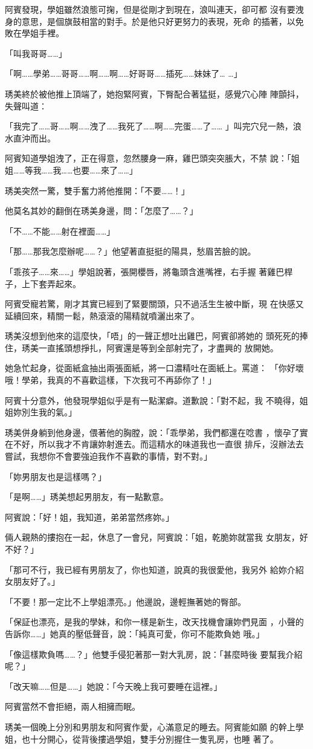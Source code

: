 阿賓發現，學姐雖然浪態可掬，但是從剛才到現在，浪叫連天，卻可都
沒有要洩身的意思，是個旗鼓相當的對手。於是他只好更努力的表現，死命
的插著，以免敗在學姐手裡。

「叫我哥哥……」

「啊……學弟……哥哥……啊……啊……好哥哥……插死……妹妹了…
…」

琇美終於被他推上頂端了，她抱緊阿賓，下臀配合著猛挺，感覺穴心陣
陣顫抖，失聲叫道：

「我完了……哥……啊……洩了……我死了……啊……完蛋……了……
」叫完穴兒一熱，浪水直沖而出。

阿賓知道學姐洩了，正在得意，忽然腰身一麻，雞巴頭突突脹大，不禁
說：「姐姐……等我……我……也要……來了……」

琇美突然一驚，雙手奮力將他推開：「不要……！」

他莫名其妙的翻倒在琇美身邊，問：「怎麼了……？」

「不……不能……射在裡面……」

「那……那我怎麼辦呢……？」他望著直挺挺的陽具，愁眉苦臉的說。

「乖孩子……來……」學姐說著，張開櫻唇，將龜頭含進嘴裡，右手握
著雞巴桿子，上下套弄起來。

阿賓受寵若驚，剛才其實已經到了緊要關頭，只不過活生生被中斷，現
在快感又延續回來，精關一鬆，熱滾滾的陽精就噴灑出來了。

琇美沒想到他來的這麼快，「唔」的一聲正想吐出雞巴，阿賓卻將她的
頭死死的捧住，琇美一直搖頭想掙扎，阿賓還是等到全部射完了，才盡興的
放開她。

她急忙起身，從面紙盒抽出兩張面紙，將一口濃精吐在面紙上。罵道：
「你好壞哦！學弟，我真的不喜歡這樣，下次我可不再舔你了！」

阿賓十分意外，他發現學姐似乎是有一點潔癖。道歉說：「對不起，我
不曉得，姐姐妳別生我的氣。」

琇美併身躺到他身邊，偎著他的胸膛，說：「乖學弟，我們都還在唸書
，懷孕了實在不好，所以我才不肯讓妳射進去。而這精水的味道我也一直很
排斥，沒辦法去嘗試，我想你不會要強迫我作不喜歡的事情，對不對。」

「妳男朋友也是這樣嗎？」

「是啊……」琇美想起男朋友，有一點歉意。

阿賓說：「好！姐，我知道，弟弟當然疼妳。」

倆人親熱的摟抱在一起，休息了一會兒，阿賓說：「姐，乾脆妳就當我
女朋友，好不好？」

「那可不行，我已經有男朋友了，你也知道，說真的我很愛他，我另外
給妳介紹女朋友好了。」

「不要！那一定比不上學姐漂亮。」他邊說，邊輕撫著她的臀部。

「保証也漂亮，是我的學妹，和你一樣是新生，改天找機會讓妳們見面
，小聲的告訴你……」她真的壓低聲音，說：「純真可愛，你可不能欺負她
哦。」

「像這樣欺負嗎……？」他雙手侵犯著那一對大乳房，說：「甚麼時後
要幫我介紹呢？」

「改天嘛……但是……」她說：「今天晚上我可要睡在這裡。」

阿賓當然不會拒絕，兩人相擁而眠。

琇美一個晚上分別和男朋友和阿賓作愛，心滿意足的睡去。阿賓能如願
的幹上學姐，也十分開心，從背後摟過學姐，雙手分別握住一隻乳房，也睡
著了。










